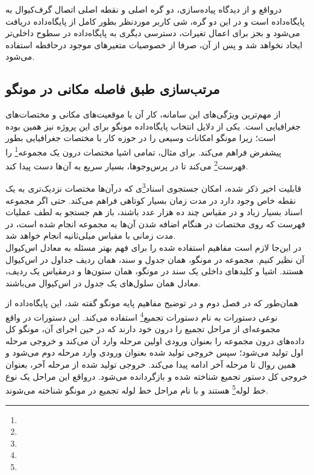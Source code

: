 درواقع و از دیدگاه پیاده‌سازی، دو گره اصلی  و  نقطه اصلی اتصال گرف‌کیوال به پایگاه‌داده است و در این دو گره، شی کاربر موردنظر بطور کامل از پایگاه‌داده دریافت می‌شود و بجز برای اعمال تغیرات، دسترسی دیگری به پایگاه‌داده در سطوح داخلی‌تر ایجاد نخواهد شد و پس از آن، صرفا از خصوصیات متغیرهای موجود درحافظه استفاده می‌شود. 

\newpage

\subsection{مرتب‌سازی طبق فاصله مکانی در مونگو}

از مهم‌ترین ویژگی‌های این سامانه، کار آن با موقعیت‌های مکانی و مختصات‌های جغرافیایی است. یکی از دلایل انتخاب پایگاه‌داده مونگو برای این پروژه نیز همین بوده است؛ زیرا مونگو امکانات وسیعی را در حوزه کار با مختصات جغرافیایی بطور پیشفرض فراهم می‌کند. برای مثال، تمامی اشیا مختصات درون یک مجموعه\footnote{} را فهرست\footnote{} می‌کند تا در پرس‌وجوها، بسیار سریع به آن‌ها دست پیدا کند.

قابلیت اخیر ذکر شده، امکان جستجوی اسناد\footnote{}ی که درآن‌ها مختصات نزدیک‌تری به یک نقطه خاص وجود دارد در مدت زمان بسیار کوتاهی فراهم می‌کند. حتی اگر مجموعه اسناد بسیار زیاد و در مقیاس چند ده هزار عدد باشند، باز هم جستجو به لطف عملیات فهرست که روی مختصات در هنگام اضافه شدن آن‌ها به مجموعه انجام شده است، در مدت زمانی با مقیاس میلی‌ثانیه انجام خواهد شد.\\

در این‌جا لازم است مفاهیم استفاده شده را برای فهم بهتر مسئله به معادل اس‌کیوال آن نظیر کنیم. مجموعه در مونگو،‌ همان جدول و سند، همان ردیف جداول در اس‌کیوال هستند. اشیا و کلیدهای داخلی یک سند در مونگو، همان ستون‌ها و درمقیاس یک ردیف، معادل همان سلول‌های یک جدول در اس‌کیوال می‌باشند.

همان‌طور که در فصل دوم و در توضیح مفاهیم پایه مونگو گفته شد، این پایگاه‌داده از نوعی دستورات به نام دستورات تجمیع\footnote{} استفاده می‌کند. این دستورات در واقع مجموعه‌ای از مراحل تجمیع را درون خود دارند که در حین اجرای آن، مونگو کل داده‌های درون مجموعه را بعنوان ورودی اولین مرحله وارد آن می‌کند و خروجی مرحله اول تولید می‌شود؛ سپس خروجی تولید شده بعنوان ورودی وارد مرحله دوم می‌شود و همین روال تا مرحله آخر ادامه پیدا می‌کند. خروجی تولید شده از مرحله آخر،‌ بعنوان خروجی کل دستور تجمیع شناخته شده و بازگردانده می‌شود. درواقع این مراحل یک نوع خط لوله\footnote{} هستند و با نام مراحل خط لوله تجمیع در مونگو شناخته می‌شوند.

\newpage

